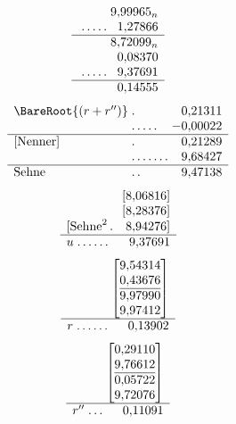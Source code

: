 \[
\begin{array}{l@{\;}l@{\;}r}
&&9{,}99965_n\\
&\mathord{.}\,\mathord{.}\,\mathord{.}\,\mathord{.}\,\mathord{.}&1{,}27866\\\hline
&&8{,}72099_n\\
&&0{,}08370\\
&\mathord{.}\,\mathord{.}\,\mathord{.}\,\mathord{.}\,\mathord{.}&9{,}37691\\\hline
&&0{,}14555
\end{array}
\]
\[
\begin{array}{l@{\;}l@{\;}r}
\BareRoot{(r+r'')}&\mathord{.}&0{,}21311\\
&\mathord{.}\,\mathord{.}\,\mathord{.}\,\mathord{.}\,\mathord{.}&-0{,}00022\\\hline
[\text{Nenner}]&\mathord{.}&0{,}21289\\
&\mathord{.}\,\mathord{.}\,\mathord{.}\,\mathord{.}\,\mathord{.}\,\mathord{.}\,\mathord{.}&9{,}68427\\\hline
\text{Sehne}&\mathord{.}\,\mathord{.}&9{,}47138
\end{array}
\]
\[
\begin{array}{l@{\;}l@{\;}r}
&&[8{,}06816]\\
&&[8{,}28376]\\
\multicolumn{3}{r}{[\text{Sehne}^2\,\mathord{.}\quad8{,}94276]}\\\hline
u&\mathord{.}\,\mathord{.}\,\mathord{.}\,\mathord{.}\,\mathord{.}\,\mathord{.}&9{,}37691
\end{array}
\]
\[
\begin{array}{l@{\;}l@{\;}r}
&&\left[\begin{array}{@{}r@{}}9{,}54314\\0{,}43676\\\hline9{,}97990\\9{,}97412\end{array}\right]\\\hline
r&\mathord{.}\,\mathord{.}\,\mathord{.}\,\mathord{.}\,\mathord{.}\,\mathord{.}&0{,}13902
\end{array}
\]
\[
\begin{array}{l@{\;}l@{\;}r}
&&\left[\begin{array}{@{}r@{}}0{,}29110\\9{,}76612\\\hline0{,}05722\\9{,}72076\end{array}\right]\\\hline
r''&\mathord{.}\,\mathord{.}\,\mathord{.}&0{,}11091
\end{array}
\]
